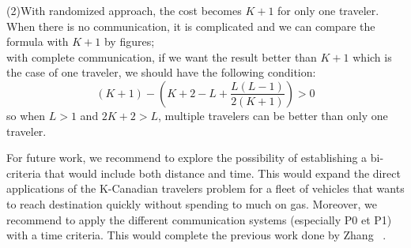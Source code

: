 \documentclass[letter-size, 11pt]{article}
\begin{document}
(2)With randomized approach, the cost becomes $K+1$ for only one traveler. When there is no communication, it is complicated and we can compare the formula with $K+1$ by figures;
\\with complete communication, if we want the result better than $K+1$ which is the case of one traveler, we should have the following condition:
\[
(K+1)-(K+2-L+\frac{L(L-1)}{2(K+1)})>0
\]
so when $L>1$ and $2K+2>L$, multiple travelers can be better than only one traveler.

For future work, we recommend to explore the possibility of establishing a bi-criteria that would include both distance and time. This would expand the direct applications of the K-Canadian travelers problem for a fleet of vehicles that wants to reach destination quickly without spending to much on gas. 
Moreover, we recommend to apply the different communication systems (especially P0 et P1) with a time criteria. This would complete the previous work done by Zhang ~\cite{ZhXuQi11}.



\end{document}

